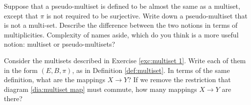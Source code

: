 \begin{exercise}
Suppose that a pseudo-multiset is defined to be almost the same as a multiset, except that $\pi$ is not required to be surjective. 
\sexc Write down a pseudo-multiset that is not a multi-set. 
\next Describe the difference between the two notions in terms of multiplicities. 
\next Complexity of names aside, which do you think is a more useful notion: multiset or pseudo-multisets? 
\endsexc
\end{exercise}

\begin{exercise}
Consider the multisets described in Exercise \ref{exc:multiset 1}. 
\sexc Write each of them in the form $(E,B,\pi)$, as in Definition \ref{def:multiset}. 
\next In terms of the same definition, what are the mappings $X\to Y$? 
\next If we remove the restriction that diagram \ref{dia:multiset map} must commute, how many mappings $X\to Y$ are there?
\endsexc
\end{exercise}

